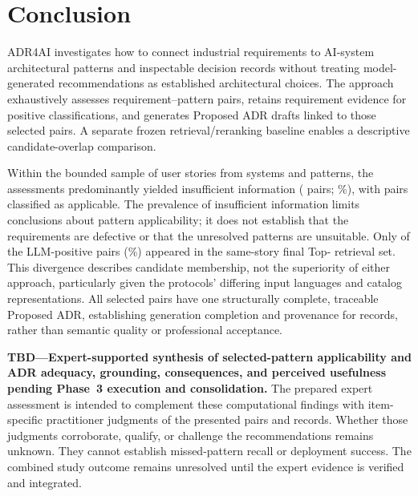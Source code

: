 \section{Conclusion}
\label{sec:conclusion}

ADR4AI investigates how to connect industrial requirements to AI-system
architectural patterns and inspectable decision records without treating
model-generated recommendations as established architectural choices.
The approach exhaustively assesses requirement--pattern pairs, retains
requirement evidence for positive classifications, and generates Proposed
ADR drafts linked to those selected pairs. A separate frozen
retrieval/reranking baseline enables a descriptive candidate-overlap comparison.

Within the bounded sample of \StudyStoryCount{} user stories from
\StudySystemCount{} systems and \StudyPatternCount{} patterns, the
\StudyAssessmentCount{} assessments predominantly yielded insufficient
information (\StudyInsufficientInformationCount{} pairs;
\RqOneInsufficientInformationPercent{}\%), with
\StudyApplicableCount{} pairs classified as applicable.
The prevalence of insufficient information limits conclusions about pattern
applicability; it does not establish that the requirements are defective or
that the unresolved patterns are unsuitable.
Only \StudyRagOverlapCount{} of the \StudyApplicableCount{} LLM-positive
pairs (\RqTwoOverlapPercent{}\%) appeared in the same-story final
Top-\RagFinalCount{} retrieval set. This divergence describes candidate
membership, not the superiority of either approach, particularly given the
protocols' differing input languages and catalog representations.
All \StudyApplicableCount{} selected pairs have one structurally complete,
traceable Proposed ADR, establishing generation completion and provenance
for \StudyAdrCount{} records, rather than semantic quality or professional
acceptance.

\noindent\textbf{TBD---Expert-supported synthesis of selected-pattern
applicability and ADR adequacy, grounding, consequences, and perceived
usefulness pending Phase~3 execution and consolidation.}
The prepared expert assessment is intended to complement these computational
findings with item-specific practitioner judgments of the presented pairs and
records. Whether those judgments corroborate, qualify, or challenge the
recommendations remains unknown. They cannot establish missed-pattern recall
or deployment success. The combined study outcome remains unresolved until
the expert evidence is verified and integrated.

